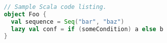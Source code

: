 \begin{frame}[fragile]
  \frametitle{\insertsection}\framesubtitle{\insertsubsection}
  \begin{lstlisting}[language=scala,keywordstyle=\bf,stringstyle=\it]
// Sample Scala code listing.
object Foo {
  val sequence = Seq("bar", "baz")
  lazy val conf = if (someCondition) a else b
}
  \end{lstlisting}
\end{frame}
